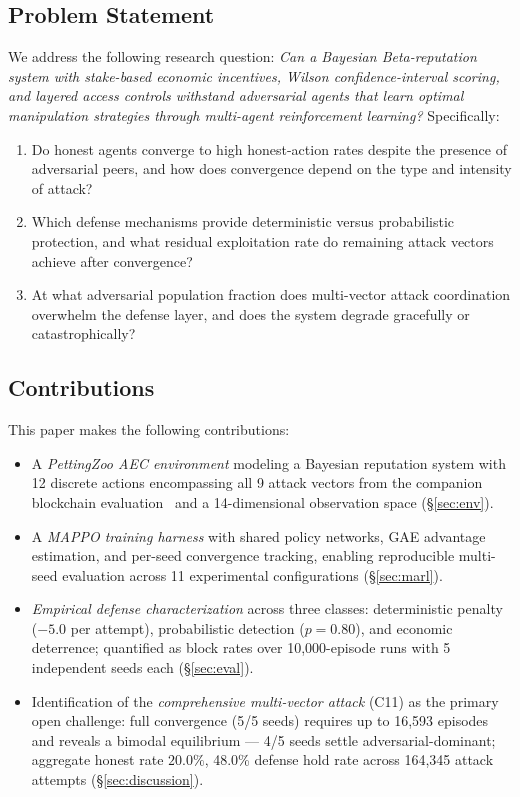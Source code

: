 \subsection{Problem Statement}

We address the following research question: \emph{Can a Bayesian
Beta-reputation system with stake-based economic incentives, Wilson
confidence-interval scoring, and layered access controls withstand
adversarial agents that learn optimal manipulation strategies through
multi-agent reinforcement learning?}  Specifically:
\begin{enumerate}[label=\textbf{RQ\arabic*.}, leftmargin=*, noitemsep]
  \item Do honest agents converge to high honest-action rates despite the
        presence of adversarial peers, and how does convergence depend on the
        type and intensity of attack?
  \item Which defense mechanisms provide deterministic versus probabilistic
        protection, and what residual exploitation rate do remaining attack
        vectors achieve after convergence?
  \item At what adversarial population fraction does multi-vector attack
        coordination overwhelm the defense layer, and does the system degrade
        gracefully or catastrophically?
\end{enumerate}

\subsection{Contributions}

This paper makes the following contributions:
\begin{itemize}[noitemsep]
  \item A \emph{PettingZoo AEC environment} modeling a Bayesian reputation
        system with 12 discrete actions encompassing all 9 attack vectors
        from the companion blockchain evaluation~\cite{almaayn2024unified}
        and a 14-dimensional observation space (\S\ref{sec:env}).
  \item A \emph{MAPPO training harness} with shared policy networks, GAE
        advantage estimation, and per-seed convergence tracking, enabling
        reproducible multi-seed evaluation across 11 experimental
        configurations (\S\ref{sec:marl}).
  \item \emph{Empirical defense characterization} across three classes:
        deterministic penalty ($-5.0$ per attempt), probabilistic detection
        ($p=0.80$), and economic deterrence; quantified as block rates over
        10{,}000-episode runs with 5 independent seeds each (\S\ref{sec:eval}).
  \item Identification of the \emph{comprehensive multi-vector attack} (C11)
        as the primary open challenge: full convergence (5/5 seeds) requires
        up to 16{,}593 episodes and reveals a bimodal equilibrium --- 4/5
        seeds settle adversarial-dominant; aggregate honest rate $20.0\%$,
        48.0\% defense hold rate across 164{,}345 attack attempts
        (\S\ref{sec:discussion}).
\end{itemize}

